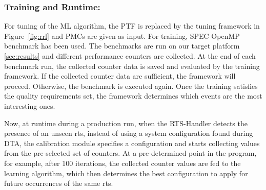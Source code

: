 \subsubsection{Training and Runtime:}
For tuning of the ML algorithm, the PTF is replaced by the tuning framework in Figure~\ref{fig:rrl} and PMCs are given as input. 
For training, SPEC OpenMP benchmark has been used. The benchmarks are run on our target platform \ref{sec:results} and different performance counters are collected. 
At the end of each benchmark run, the collected counter
data is saved and evaluated by the training framework. 
If the collected counter data are sufficient, the framework will proceed. Otherwise, the benchmark is executed again. 
Once the training satisfies the quality requirements set, the framework determines which events are the most interesting ones.

Now, at runtime during a production run, when the RTS-Handler
detects the presence of an unseen rts, instead of using a system configuration found during DTA, the calibration module specifies a configuration and starts collecting values from the pre-selected set of counters.
At a pre-determined point in the program, for example, after 100 iterations, the collected counter values are fed to the learning algorithm, which then determines the best configuration to apply for future occurrences of the same rts.